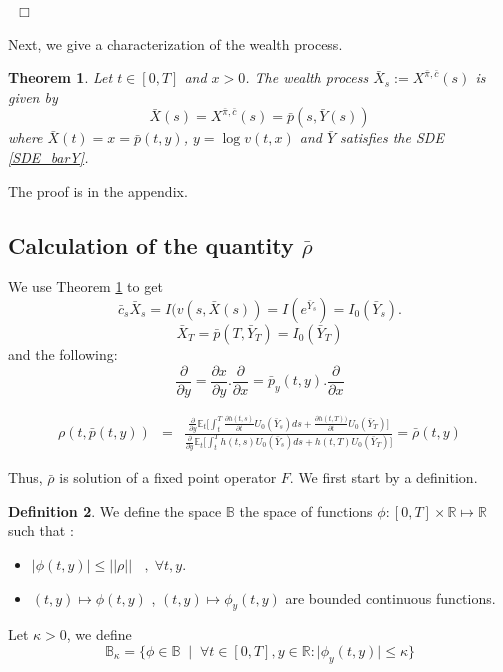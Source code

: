 \documentclass[11pt, psfig]{article}
\newtheorem{theorem}{Theorem}[section]
\theoremstyle{definition}
\newtheorem{definition}[theorem]{Definition}
\theoremstyle{remark}
\numberwithin{equation}{section}
\def\sR{\mathbb{R}}
\def\sR{\mathbb{R}}
\def\sE{\mathbb{E}}
\def \ep{\hbox{ }\hfill$\Box$}
\begin{document}
\ep


Next, we give a characterization of the wealth process.

\begin{theorem}\label{barXbarp}
Let $t\in [0,T]$ and $x>0$.
The wealth process $\bar{X}_s := X^{\bar{\pi},\bar{c}}(s)$ is given by
$$\bar{X}(s)=X^{\bar{\pi},\bar{c}}(s)=\bar{p}(s,\bar{Y}(s))$$ where
$\bar{X}(t)=x=\bar{p}(t,y)$,  $y=\log v(t,x)$ and $\bar{Y}$ satisfies the SDE \eqref{SDE_barY}.
 \end{theorem}
 
The proof is in the appendix. 

\subsection{Calculation of the quantity $\bar{\rho}$}


We use Theorem \ref{barXbarp} to get $$\bar{c}_s\bar{X}_s = I(v(s,\bar{X}(s))=I(e^{\bar{Y}_s})=I_0(\bar{Y}_s).$$
$$\bar{X}_T=\bar{p}(T, \bar{Y}_T)= I_0(\bar{Y}_T)$$
 and the following: $$\frac{\partial }{\partial y}= \frac{\partial x}{\partial y}. \frac{\partial }{\partial x} = \bar{p}_y(t,y) . \frac{\partial }{\partial x}$$

 \begin{eqnarray}\label{equation_rho}
\rho(t,\bar{p}(t,y)) &=& \frac{\frac{\partial }{\partial y} \sE_{t}\bigg[\int_{t}^{T}\frac{\partial h(t,s)}{\partial t}U_0(\bar{Y}_s)ds+\frac{\partial h(t,T))}{\partial t}U_0(\bar{Y}_T)\bigg]}{\frac{\partial }{\partial y} \sE_{t}\bigg[\int_{t}^{T}h(t,s)U_0(\bar{Y}_s)ds+h(t,T)U_0(\bar{Y}_T)\bigg]}=\bar{\rho}(t,y)
\end{eqnarray}


Thus, $\bar{\rho}$ is solution of a fixed point operator $F$. We first start by a definition.


\begin{definition}\label{space_functions}
We define the space $\mathbb{B}$ the space of functions $\phi: [0,T]\times \sR \mapsto \sR$ such that :
\begin{itemize}
\item $|\phi(t,y)| \leq ||\rho||$ $\;\; , \; \forall t,y$.
 \item $(t,y)\mapsto \phi(t,y)$ , $(t,y)\mapsto \phi_y(t,y)$ are bounded continuous functions.
 \end{itemize}
 
Let $\kappa>0$, we define $$\mathbb{B}_{\kappa} = \{ \phi\in \mathbb{B}\;\; | \;\; \forall t\in [0,T], y\in \sR: |\phi_y(t,y)| \leq \kappa  \}$$

\end{definition}
\end{document}
